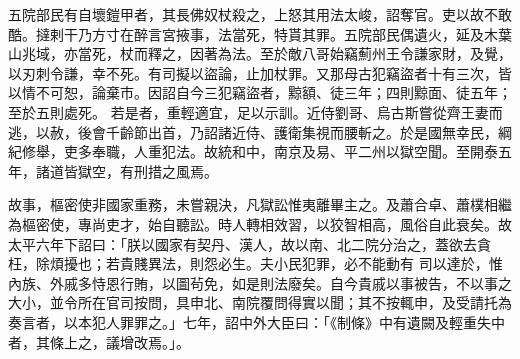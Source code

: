 \begin{pinyinscope}
 五院部民有自壞鎧甲者，其長佛奴杖殺之，上怒其用法太峻，詔奪官。吏以故不敢酷。撻剌干乃方寸在醉言宮掖事，法當死，特貰其罪。五院部民偶遺火，延及木葉山兆域，亦當死，杖而釋之，因著為法。至於敵八哥始竊薊州王令謙家財，及覺，以刃刺令謙，幸不死。有司擬以盜論，止加杖罪。又那母古犯竊盜者十有三次，皆以情不可恕，論棄市。因詔自今三犯竊盜者，黥額、徒三年；四則黥面、徒五年；至於五則處死。
 若是者，重輕適宜，足以示訓。近侍劉哥、烏古斯嘗從齊王妻而逃，以赦，後會千齡節出首，乃詔諸近侍、護衛集視而腰斬之。於是國無幸民，綱紀修舉，吏多奉職，人重犯法。故統和中，南京及易、平二州以獄空聞。至開泰五年，諸道皆獄空，有刑措之風焉。



 故事，樞密使非國家重務，未嘗親決，凡獄訟惟夷離畢主之。及蕭合卓、蕭樸相繼為樞密使，專尚吏才，始自聽訟。時人轉相效習，以狡智相高，風俗自此衰矣。故太平六年下詔曰：「朕以國家有契丹、漢人，故以南、北二院分治之，蓋欲去貪枉，除煩擾也；若貴賤異法，則怨必生。夫小民犯罪，必不能動有
 司以達於，惟內族、外戚多恃恩行賄，以圖茍免，如是則法廢矣。自今貴戚以事被告，不以事之大小，並令所在官司按問，具申北、南院覆問得實以聞；其不按輒申，及受請托為奏言者，以本犯人罪罪之。」七年，詔中外大臣曰：「《制條》中有遺闕及輕重失中者，其條上之，議增改焉。」。



\end{pinyinscope}